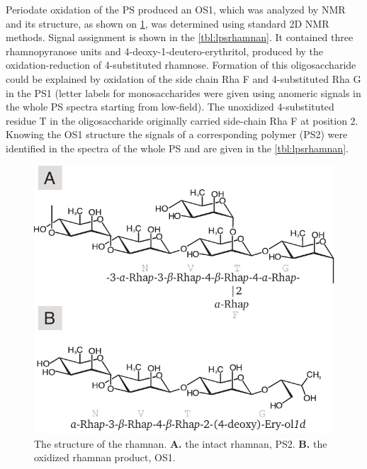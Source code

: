 Periodate oxidation of the \ac{PS} produced an \ac{OS}1, which was analyzed by \ac{NMR} and its
structure, as shown on \cref{fig:lpsrhamnan}, was determined using standard 2D \ac{NMR}
methods. Signal assignment is shown in the \cref{tbl:lpsrhamnan}. It contained three
rhamnopyranose units and 4-deoxy-1-deutero-erythritol, produced by the oxidation-reduction of
4-substituted rhamnose. Formation of this oligosaccharide could be explained by oxidation of the
side chain Rha F and 4-substituted Rha G in the \ac{PS}1 (letter labels for monosaccharides were
given using anomeric signals in the whole \ac{PS} spectra starting from low-field). The unoxidized
4-substituted residue T in the oligosaccharide originally carried side-chain Rha F at position
2. Knowing the \ac{OS}1 structure the signals of a corresponding polymer (\ac{PS}2) were
identified in the spectra of the whole \ac{PS} and are given in the \cref{tbl:lpsrhamnan}.

\begin{figure}[htb]
  \begin{center}
    \includegraphics[]{lps_chapter/img/lpsrhamnan.pdf}
  \end{center}
  \caption[The structure of the \caulobacter rhamnan.]{The structure of the \caulobacter rhamnan. \textbf{A.} the intact rhamnan, \ac{PS}2. \textbf{B.} the oxidized rhamnan product, \ac{OS}1.}
  \label{fig:lpsrhamnan}
\end{figure}

